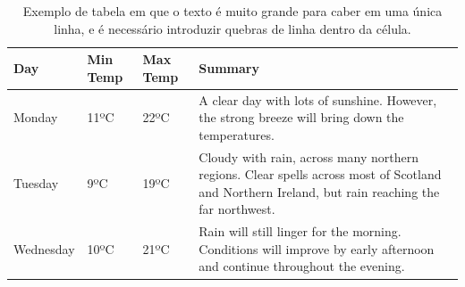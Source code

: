 \documentclass[times,english,brazilian,oneside,section=TITLE]{ifes8}
\begin{document}
\begin{table}[h]
  \begin{center}
    \caption[Exemplo de tabela em que é necessário quebras de linha.]{Exemplo de
      tabela em que o texto é muito grande para caber em uma única linha, e é
      necessário introduzir quebras de linha dentro da célula.}
    \label{tab:ex3}
    \begin{tabular}{lllp{5cm}}
      \toprule
      Day       & Min Temp & Max Temp & Summary                                                      \\
      \midrule
      Monday    & 11ºC     & 22ºC     & A clear day with lots of sunshine.  
                                        However, the strong breeze will bring down the temperatures. \\
      Tuesday   & 9ºC      & 19ºC     & Cloudy with rain, across many northern regions. Clear spells 
                                        across most of Scotland and Northern Ireland, 
                                        but rain reaching the far northwest.                         \\
      Wednesday & 10ºC     & 21ºC     & Rain will still linger for the morning. 
                                        Conditions will improve by early afternoon and continue 
                                        throughout the evening.                                      \\
      \bottomrule
    \end{tabular}
  \end{center}
\end{table}
\end{document}
